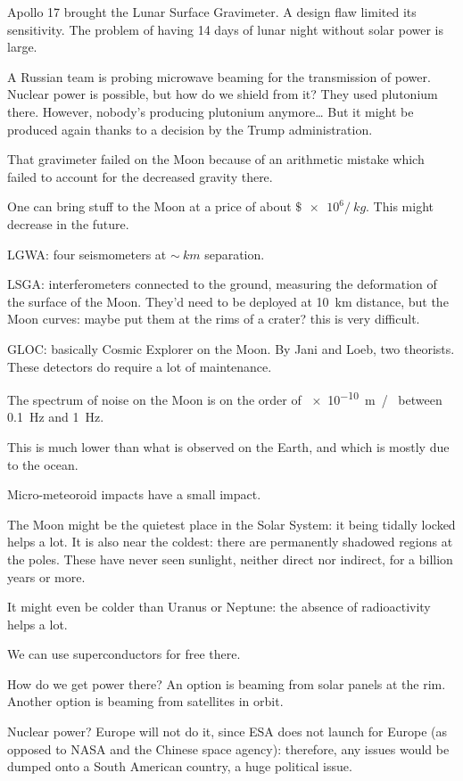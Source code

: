 \documentclass[main.tex]{subfiles}
\begin{document}
Apollo 17 brought the Lunar Surface Gravimeter. A design flaw limited its sensitivity. 
The problem of having 14 days of lunar night without solar power is large. 

A Russian team is probing microwave beaming for the transmission of power. 
Nuclear power is possible, but how do we shield from it? 
They used plutonium there. However, nobody's producing plutonium anymore\dots 
But it might be produced again thanks to a decision by the Trump administration. 

That gravimeter failed on the Moon because of an arithmetic mistake which 
failed to account for the decreased gravity there. 

One can bring stuff to the Moon at a price of about \(\$ \num{e6} / \SI{}{kg}\). 
This might decrease in the future. 

LGWA: four seismometers at \(\sim \SI{}{km}\) separation. 

LSGA: interferometers connected to the ground, measuring the deformation of the surface of the Moon.
They'd need to be deployed at \SI{10}{km} distance, but the Moon curves: maybe put them 
at the rims of a crater? this is very difficult.  

GLOC: basically Cosmic Explorer on the Moon.
By Jani and Loeb, two theorists.
These detectors do require a lot of maintenance. 

The spectrum of noise on the Moon is on the order of \SI{e-10}{m / } between \SI{0.1}{Hz} and \SI{1}{Hz}. 

This is much lower than what is observed on the Earth, and which is mostly due to the ocean. 

Micro-meteoroid impacts have a small impact. 

The Moon might be the quietest place in the Solar System: 
it being tidally locked helps a lot. 
It is also near the coldest: there are permanently shadowed regions at the poles. 
These have never seen sunlight, neither direct nor indirect, for a billion years or more. 

It might even be colder than Uranus or Neptune: the absence of radioactivity helps a lot. 

We can use superconductors for free there. 

How do we get power there? 
An option is beaming from solar panels at the rim. 
Another option is beaming from satellites in orbit. 

Nuclear power? Europe will not do it, since ESA does not launch for Europe (as opposed to NASA and the Chinese space agency): therefore, any issues would be dumped onto a South American country, a huge political issue. 
\end{document}
